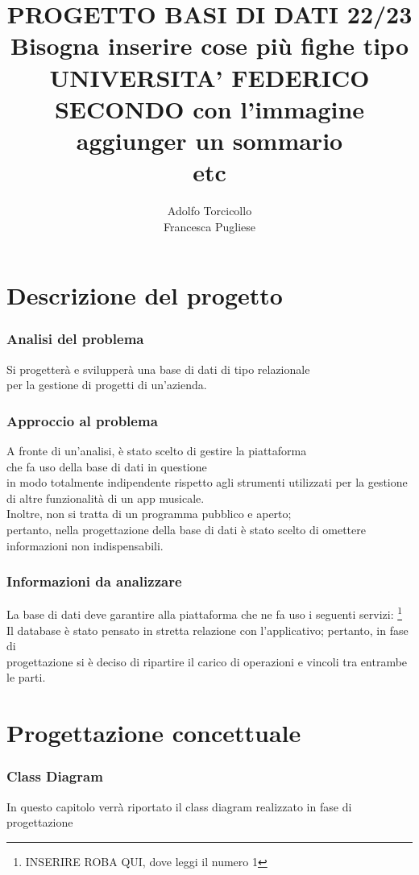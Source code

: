 \documentclass[11pt]{article}
\title{PROGETTO BASI DI DATI 22/23 
\\ Bisogna inserire cose più fighe tipo 
\\ UNIVERSITA' FEDERICO SECONDO con l'immagine 
\\ aggiunger un sommario \\ etc }
\author{Adolfo Torcicollo \\ Francesca Pugliese}
\date{}
\begin{document}
	\part{Descrizione del progetto}
	\section{Analisi del problema}
	
	Si progetterà e svilupperà una base di dati di tipo relazionale\\ per la gestione di progetti di un’azienda. \\
	
	\section{Approccio al problema}
	
	A fronte di un’analisi, è stato scelto di gestire la piattaforma\\ che fa uso della base di dati in questione \\
	in modo totalmente indipendente rispetto agli strumenti utilizzati per la gestione di altre funzionalità di un app musicale.\\
	Inoltre, non si tratta di un programma pubblico e aperto;\\ pertanto, nella progettazione della base di dati è stato scelto di omettere 
	informazioni non indispensabili.\\
	
	\section{Informazioni da analizzare}
	
	La base di dati deve garantire alla piattaforma che ne fa uso i seguenti servizi:
	\footnote{INSERIRE ROBA QUI, dove leggi il numero 1}
	\\
	Il database è stato pensato in stretta relazione con l’applicativo; pertanto, in fase di \\ 
	progettazione si è deciso di ripartire il carico di operazioni e vincoli tra entrambe le parti.\\
	
	\clearpage
	
	\part{Progettazione concettuale}
	\section{Class Diagram}
	In questo capitolo verrà riportato il class diagram realizzato in fase di progettazione \\
\end{document}
